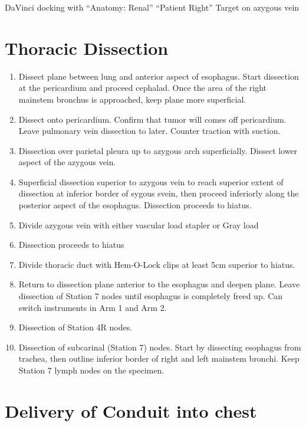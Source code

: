 \documentclass[
  letterpaper,
]{scrbook}
\begin{document}
DaVinci docking with ``Anatomy: Renal'' ``Patient Right'' Target on
azygous vein

\section{Thoracic Dissection}\label{thoracic-dissection}

\begin{enumerate}
\def\labelenumi{\arabic{enumi}.}
\item
  Dissect plane between lung and anterior aspect of esophagus. Start
  dissection at the pericardium and proceed cephalad. Once the area of
  the right mainstem bronchus is approached, keep plane more
  superficial.
\item
  Dissect onto pericardium. Confirm that tumor will comes off
  pericardium. Leave pulmonary vein dissection to later. Counter
  traction with suction.
\item
  Dissection over parietal pleura up to azygous arch superficially.
  Dissect lower aspect of the azygous vein.
\item
  Superficial dissection superior to azygous vein to reach superior
  extent of dissection at inferior border of sygous svein, then proceed
  inferiorly along the posterior aspect of the esophagus. Dissection
  proceeds to hiatus.
\item
  Divide azygous vein with either vascular load stapler or Gray load
\item
  Dissection proceeds to hiatus
\item
  Divide thoracic duct with Hem-O-Lock clips at least 5cm superior to
  hiatus.
\item
  Return to dissection plane anterior to the esophagus and deepen plane.
  Leave dissection of Station 7 nodes until esophagus is completely
  freed up. Can switch instruments in Arm 1 and Arm 2.
\item
  Dissection of Station 4R nodes.
\item
  Dissection of subcarinal (Station 7) nodes. Start by dissecting
  esophagus from trachea, then outline inferior border of right and left
  mainstem bronchi. Keep Station 7 lymph nodes on the specimen.
\end{enumerate}

\section{Delivery of Conduit into
chest}\label{delivery-of-conduit-into-chest}
\end{document}
